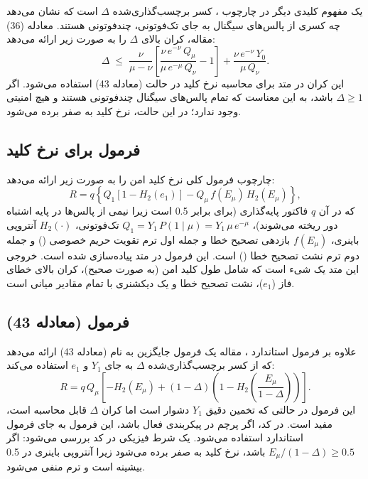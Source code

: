 یک مفهوم کلیدی دیگر در چارچوب ، کسر برچسب‌گذاری‌شده $\Delta$ است که نشان می‌دهد چه کسری از پالس‌های سیگنال به جای تک‌فوتونی، چندفوتونی هستند. معادله (36) مقاله، کران بالای $\Delta$ را به صورت زیر ارائه می‌دهد:
\begin{equation}
	\Delta \;\le\; \frac{\nu}{\mu - \nu}\left[\frac{\nu\,e^{-\nu}\,Q_\mu}{\mu\,e^{-\mu}\,Q_\nu} - 1\right] + \frac{\nu\,e^{-\nu}\,Y_0}{\mu\,Q_\nu}.
\end{equation}
این کران در متد  برای محاسبه نرخ کلید در حالت  (معادله 43) استفاده می‌شود. اگر $\Delta \ge 1$ باشد، به این معناست که تمام پالس‌های سیگنال چندفوتونی هستند و هیچ امنیتی وجود ندارد؛ در این حالت، نرخ کلید به صفر برده می‌شود.

\subsection{فرمول  برای نرخ کلید}

چارچوب  فرمول کلی نرخ کلید امن را به صورت زیر ارائه می‌دهد:
\begin{equation}
	R = q\left\{Q_1\left[1 - H_2(e_1)\right] - Q_\mu\,f(E_\mu)\,H_2(E_\mu)\right\},
\end{equation}
که در آن $q$ فاکتور پایه‌گذاری (برای  برابر 0.5 است زیرا نیمی از پالس‌ها در پایه اشتباه دور ریخته می‌شوند)، $Q_1 = Y_1\,P(1 \mid \mu) = Y_1\,\mu\,e^{-\mu}$  تک‌فوتونی، $H_2(\cdot)$ آنتروپی باینری، $f(E_\mu)$ بازدهی تصحیح خطا و جمله اول ترم تقویت حریم خصوصی () و جمله دوم ترم نشت تصحیح خطا () است. این فرمول در متد  پیاده‌سازی شده است. خروجی این متد یک شیء  است که شامل طول کلید امن (به صورت صحیح)، کران بالای خطای فاز ($e_1$)، نشت تصحیح خطا و یک دیکشنری  با تمام مقادیر میانی است.

\subsection{فرمول  (معادله 43)}

علاوه بر فرمول استاندارد ، مقاله  یک فرمول جایگزین به نام  (معادله 43) ارائه می‌دهد که از کسر برچسب‌گذاری‌شده $\Delta$ به جای $Y_1$ و $e_1$ استفاده می‌کند:
\begin{equation}
	R = q\,Q_\mu\left[-H_2(E_\mu) + (1 - \Delta)\left(1 - H_2\!\left(\frac{E_\mu}{1 - \Delta}\right)\right)\right].
\end{equation}
این فرمول در حالتی که تخمین دقیق $Y_1$ دشوار است اما کران $\Delta$ قابل محاسبه است، مفید است. در کد، اگر پرچم  در پیکربندی فعال باشد، این فرمول به جای فرمول استاندارد استفاده می‌شود. یک شرط فیزیکی در کد بررسی می‌شود: اگر $E_\mu / (1 - \Delta) \ge 0.5$ باشد، نرخ کلید به صفر برده می‌شود زیرا آنتروپی باینری در 0.5 بیشینه است و ترم  منفی می‌شود.

